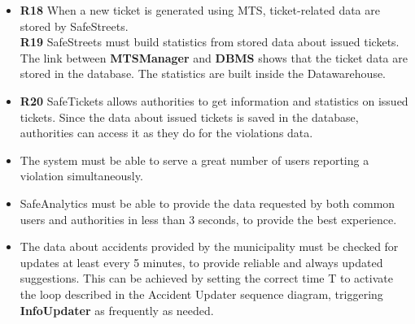\documentclass[./main.tex]{subfiles}
\begin{document}

\begin{itemize}
\item
  \textbf{R18} When a new ticket is generated using MTS, ticket-related
  data are stored by SafeStreets.\\
  \textbf{R19} SafeStreets must build statistics from stored data about
  issued tickets.
  \subitem
    The link between \textbf{MTSManager} and \textbf{DBMS} shows that the ticket data are stored in the database. The statistics are built inside the Datawarehouse.

\item
  \textbf{R20} SafeTickets allows authorities to get information and
  statistics on issued tickets.
  \subitem
    Since the data about issued tickets is saved in the database, authorities can access it as they do for the violations data.
\end{itemize}

\begin{itemize}
\item
  The system must be able to serve a great number of users reporting a
  violation simultaneously.
  \subitem
\item
  SafeAnalytics must be able to provide the data requested by both
  common users and authorities in less than 3 seconds, to provide the
  best experience.
  \subitem 
\item
  The data about accidents provided by the municipality must be checked
  for updates at least every 5 minutes, to provide reliable and always
  updated suggestions.
  \subitem
    This can be achieved by setting the correct time T to activate the loop described in the Accident Updater sequence diagram, triggering \textbf{InfoUpdater} as frequently as needed.
\end{itemize}
\end{document}

